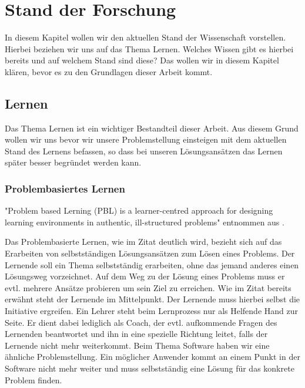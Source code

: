 
\chapter{Stand der Forschung}
In diesem Kapitel wollen wir den aktuellen Stand der Wissenschaft vorstellen. Hierbei beziehen wir uns auf das Thema Lernen. Welches Wissen gibt es hierbei bereits und auf welchem Stand sind diese? Das wollen wir in diesem Kapitel klären, bevor es zu den Grundlagen dieser Arbeit kommt.

\section{Lernen}
Das Thema Lernen ist ein wichtiger Bestandteil dieser Arbeit. Aus diesem Grund wollen wir uns bevor wir unsere Problemstellung einsteigen mit dem aktuellen Stand des Lernens befassen, so dass bei unseren Lösungsansätzen das Lernen später besser begründet werden kann.


\subsection{Problembasiertes Lernen}
"Problem based Lerning (PBL) is a learner-centred approach for designing learning environments in authentic, ill-structured problems" entnommen aus \cite{zumbachproblembasiertes}. \par

Das Problembasierte Lernen, wie im Zitat deutlich wird, bezieht sich auf das Erarbeiten von selbstständigen Lösungsansätzen zum Lösen eines Problems. Der Lernende soll ein Thema selbstständig erarbeiten, ohne das jemand anderes einen Lösungsweg vorzeichnet. Auf dem Weg zu der Lösung eines Problems muss er evtl. mehrere Ansätze probieren um sein Ziel zu erreichen. Wie im Zitat bereits erwähnt steht der Lernende im Mittelpunkt. Der Lernende muss hierbei selbst die Initiative ergreifen. Ein Lehrer steht beim Lernprozess nur als Helfende Hand zur Seite. Er dient dabei lediglich als Coach, der evtl. aufkommende Fragen des Lernenden beantwortet und ihn in eine spezielle Richtung leitet, falls der Lernende nicht mehr weiterkommt. Beim Thema Software haben wir eine ähnliche Problemstellung. Ein möglicher Anwender kommt an einem Punkt in der Software nicht mehr weiter und muss selbstständig eine Lösung für das konkrete Problem finden. 
 
